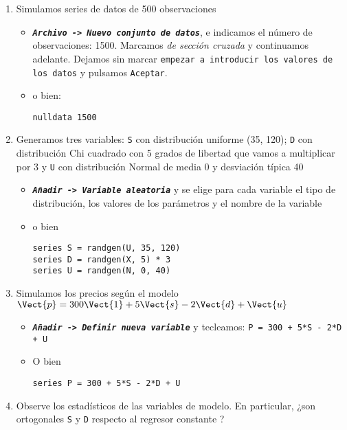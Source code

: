 \documentclass[11pt]{article}
\begin{document}
\begin{enumerate}
\item Simulamos series de datos de 500 observaciones

\begin{itemize}
\item \textbf{\emph{\texttt{Archivo -> Nuevo conjunto de datos}}}, e indicamos el número
de observaciones: 1500. Marcamos \emph{de sección cruzada} y
continuamos adelante. Dejamos sin marcar \texttt{empezar a introducir
     los valores de los datos} y pulsamos \texttt{Aceptar}.

\item o bien:
\begin{verbatim}
nulldata 1500
\end{verbatim}
\end{itemize}

\item Generamos tres variables: \texttt{S} con distribución uniforme (35, 120);
\texttt{D} con distribución Chi cuadrado con 5 grados de libertad que
vamos a multiplicar por 3 y \texttt{U} con distribución Normal de media 0
y desviación típica 40

\begin{itemize}
\item \textbf{\emph{\texttt{Añadir -> Variable aleatoria}}} y se elige para cada
variable el tipo de distribución, los valores de los parámetros y
el nombre de la variable

\item o bien
\begin{verbatim}
series S = randgen(U, 35, 120)
series D = randgen(X, 5) * 3
series U = randgen(N, 0, 40)
\end{verbatim}
\end{itemize}

\item Simulamos los precios según el modelo \(\Vect{p} = 300\Vect{1} +
   5\Vect{s} - 2\Vect{d} + \Vect{u}\)

\begin{itemize}
\item \textbf{\emph{\texttt{Añadir -> Definir nueva variable}}} y tecleamos: \texttt{P = 300 + 5*S - 2*D + U}

\item O bien 
\begin{verbatim}
series P = 300 + 5*S - 2*D + U
\end{verbatim}
\end{itemize}

\item Observe los estadísticos de las variables de modelo. En particular,
¿son ortogonales \texttt{S} y \texttt{D} respecto al regresor constante ?


\end{enumerate}
\end{document}
